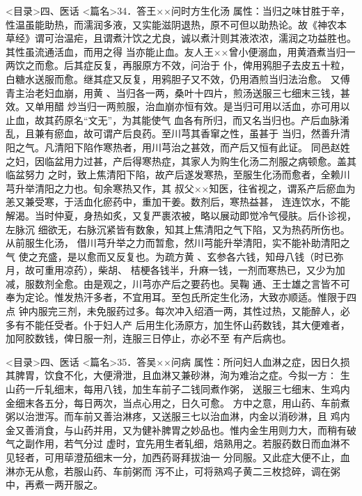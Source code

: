 \documentclass[a4paper,12pt,UTF8,twoside]{ctexbook}
\begin{document}
<目录>四、医话
<篇名>34．答王××问时方生化汤
属性：当归之味甘胜于辛，性温虽能助热，而濡润多液，又实能滋阴退热，原不可但以助热论。故《神农本 
草经》谓可治温疟，且谓煮汁饮之尤良，诚以煮汁则其液浓浓，濡润之功益胜也。其性虽流通活血，而用之得 
当亦能止血。友人王××曾小便溺血，用黄酒煮当归一两饮之而愈。后其症反复，再服原方不效，问治于 
仆，俾用鸦胆子去皮五十粒，白糖水送服而愈。继其症又反复，用鸦胆子又不效，仍用酒煎当归法治愈。 
又傅青主治老妇血崩，用黄 、当归各一两，桑叶十四片，煎汤送服三七细末三钱，甚效。又单用醋 
炒当归一两煎服，治血崩亦恒有效。是当归可用以活血，亦可用以止血，故其药原名“文无”，为其能使气 
血各有所归，而又名当归也。产后血脉淆乱，且兼有瘀血，故可谓产后良药。至川芎其香窜之性，虽甚于 
当归，然善升清阳之气。凡清阳下陷作寒热者，用川芎治之甚效，而产后又恒有此证。 
同邑赵姓之妇，因临盆用力过甚，产后得寒热症，其家人为购生化汤二剂服之病顿愈。盖其临盆努力 
之时，致上焦清阳下陷，故产后遂发寒热，至服生化汤而愈者，全赖川芎升举清阳之力也。旬余寒热又作，其 
叔父××知医，往省视之，谓系产后瘀血为恙又兼受寒，于活血化瘀药中，重加干姜。数剂后，寒热益甚， 
连连饮水，不能解渴。当时仲夏，身热如炙，又复严裹浓被，略以展动即觉冷气侵肤。后仆诊视，左脉沉 
细欲无，右脉沉紧皆有数象，知其上焦清阳之气下陷，又为热药所伤也。从前服生化汤， 
借川芎升举之力而暂愈，然川芎能升举清阳，实不能补助清阳之气 
使之充盛，是以愈而又反复也。为疏方黄 、玄参各六钱，知母八钱（时已弥月，故可重用凉药），柴胡、 
桔梗各钱半，升麻一钱，一剂而寒热已，又少为加减，服数剂全愈。由是观之，川芎亦产后之要药也。吴鞠 
通、王士雄之言皆不可奉为定论。惟发热汗多者，不宜用耳。至包氏所定生化汤，大致亦顺适。惟限于四点 
钟内服完三剂，未免服药过多。每次冲入绍酒一两，其性过热，又能醉人，必多有不能任受者。仆于妇人产 
后用生化汤原方，加生怀山药数钱，其大便难者，加阿胶数钱，俾日服一剂，连服三日停止，亦必不至 
有产后病也。 

<目录>四、医话
<篇名>35．答吴××问病
属性：所问妇人血淋之症，因日久损其脾胃，饮食不化，大便滑泄，且血淋又兼砂淋，洵为难治之症。今拟一方∶ 
生山药一斤轧细末，每用八钱，加生车前子二钱同煮作粥， 
送服三七细末、生鸡内金细末各五分，每日两次，当点心用之，日久可愈。 
方中之意，用山药、车前煮粥以治泄泻。而车前又善治淋疼，又送服三七以治血淋，内金以消砂淋，且 
鸡内金又善消食，与山药并用，又为健补脾胃之妙品也。惟内金生用则力大，而稍有破气之副作用，若气分过 
虚时，宜先用生者轧细，焙熟用之。若服药数日而血淋不见轻者，可用荜澄茄细末一分，加西药哥拜拔油一 
分同服。又此症大便不止，血淋亦无从愈，若服山药、车前粥而 
泻不止，可将熟鸡子黄二三枚捻碎，调在粥中，再煮一两开服之。 
\end{document}
